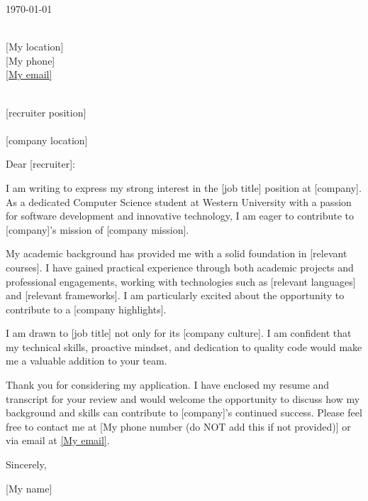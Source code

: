 \documentclass[11pt]{article}
\begin{document}
\begin{flushright}
\today
\end{flushright}

\noindent [My name]\\
[My location] \\
[My phone] \\
\href{mailto:[My email]}{[My email]} \\

\vspace{1em}

\noindent [company] \\
[recruiter position] \\
[recruiter (if none provided, put Hiring Manager)] \\
[company location] \\

\vspace{1em}

\noindent Dear [recruiter]:

\setlength{\parindent}{15pt}
\setlength{\parskip}{0.75em}

I am writing to express my strong interest in the [job title] position at [company]. As a dedicated Computer Science student at Western University with a passion for software development and innovative technology, I am eager to contribute to [company]’s mission of [company mission].

My academic background has provided me with a solid foundation in [relevant courses]. I have gained practical experience through both academic projects and professional engagements, working with technologies such as [relevant languages] and [relevant frameworks]. I am particularly excited about the opportunity to contribute to a [company highlights].

I am drawn to [job title] not only for its [company culture]. I am confident that my technical skills, proactive mindset, and dedication to quality code would make me a valuable addition to your team.

Thank you for considering my application. I have enclosed my resume and transcript for your review and would welcome the opportunity to discuss how my background and skills can contribute to [company]’s continued success. Please feel free to contact me at [My phone number (do NOT add this if not provided)] or via email at \href{[My email]}{[My email]}.

\setlength{\parindent}{0pt}

\vspace{1em}
Sincerely,

\vspace{1em}
[My name]
\end{document}
